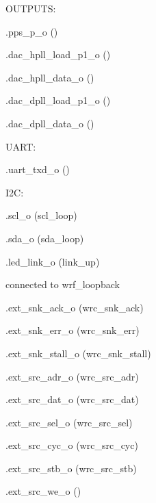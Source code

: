 \begin{dig}
\begin{dig}
\begin{dig}
\begin{dig}
            \end{dig}
        \end{dig}
    \item OUTPUTS:
        \begin{dig}
        \item .pps\_p\_o                    ()
        \item .dac\_hpll\_load\_p1\_o         ()
        \item .dac\_hpll\_data\_o            ()
        \item .dac\_dpll\_load\_p1\_o         ()
        \item .dac\_dpll\_data\_o            ()
        \item UART:
            \begin{dig}
            \item .uart\_txd\_o                 ()
            \end{dig}
        \item I2C:
            \begin{dig}
            \item .scl\_o                      (scl\_loop)
            \item .sda\_o                      (sda\_loop)
            \end{dig}
        \item .led\_link\_o                 (link\_up)
        \item connected to wrf\_loopback
            \begin{dig}
            \item .ext\_snk\_ack\_o              (wrc\_snk\_ack)
            \item .ext\_snk\_err\_o              (wrc\_snk\_err)
            \item .ext\_snk\_stall\_o            (wrc\_snk\_stall)
            \item 
            \item .ext\_src\_adr\_o              (wrc\_src\_adr)
            \item .ext\_src\_dat\_o              (wrc\_src\_dat)
            \item .ext\_src\_sel\_o              (wrc\_src\_sel)
            \item .ext\_src\_cyc\_o              (wrc\_src\_cyc)
            \item .ext\_src\_stb\_o              (wrc\_src\_stb)
            \item .ext\_src\_we\_o               ()
            \end{dig}

\end{dig}
\end{dig}
\end{dig}
